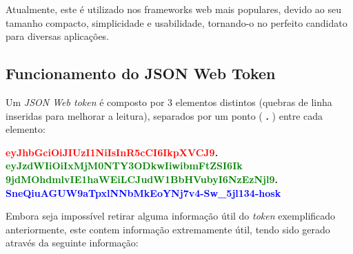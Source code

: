 Atualmente, este é utilizado nos frameworks web mais populares, devido ao seu tamanho compacto, simplicidade e usabilidade, tornando-o no perfeito candidato para diversas aplicações.

\cleardoublepage
\subsection{Funcionamento do JSON Web Token}

Um \emph{JSON Web token} é composto por 3 elementos distintos (quebras de linha inseridas para melhorar a leitura), separados por um ponto (\textbf{ . }) entre cada elemento:

\begin{center}
    \textbf{\textcolor{red}{eyJhbGciOiJIUzI1NiIsInR5cCI6IkpXVCJ9}.\\
    \textcolor{green}{eyJzdWIiOiIxMjM0NTY3ODkwIiwibmFtZSI6Ik\\9jdMOhdmlvIE1haWEiLCJudW1BbHVubyI6NzEzNjl9}.\\
    \textcolor{blue}{SneQiuAGUW9aTpxlNNbMkEoYNj7v4-Sw\_5jl134-hosk}}
\end{center}

Embora seja impossível retirar alguma informação útil do \emph{token} exemplificado anteriormente, este contem informação extremamente útil, tendo sido gerado através da seguinte informação:

